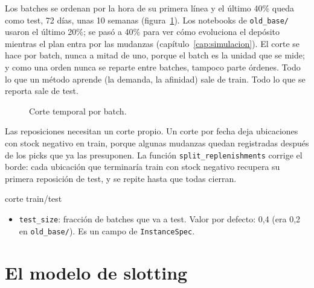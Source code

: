 \documentclass[11pt,a4paper,oneside]{report}
\newcommand{\code}[1]{\texttt{\small #1}}
\begin{document}
Los batches se ordenan por la hora de su primera línea y el último 40\% queda como test,
72 días, unas 10 semanas (figura~\ref{fig:split}). Los notebooks de \code{old\_base/} usaron el último
20\%; se pasó a 40\% para ver cómo evoluciona el depósito mientras el plan entra por las
mudanzas (capítulo~\ref{cap:simulacion}). El corte se hace por batch, nunca a mitad de uno, porque el batch es
la unidad que se mide; y como una orden nunca se reparte entre batches, tampoco parte órdenes.
Todo lo que un método aprende (la demanda, la afinidad) sale de train. Todo lo que se reporta
sale de test.

\begin{figure}[ht]
\centering
{}
\caption{Corte temporal por batch.}
\label{fig:split}
\end{figure}

Las reposiciones necesitan un corte propio. Un corte por fecha deja ubicaciones con stock
negativo en train, porque algunas mudanzas quedan registradas después de los picks que ya las
presuponen. La función \code{split\_replenishments} corrige el borde: cada ubicación que
terminaría train con stock negativo recupera su primera reposición de test, y se repite hasta
que todas cierran.

\begin{hiper}{corte train/test}
\begin{itemize}
  \item \code{test\_size}: fracción de batches que va a test. Valor por defecto: 0,4 (era 0,2 en
        \code{old\_base/}). Es un campo de \code{InstanceSpec}.
\end{itemize}
\end{hiper}

\chapter{El modelo de slotting}
\label{cap:modelo}
\end{document}
